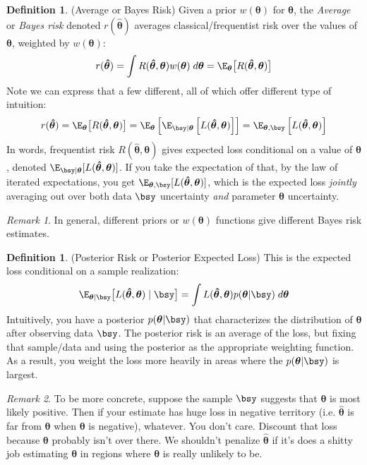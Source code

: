 \documentclass[12pt]{article}
\theoremstyle{plain}
\theoremstyle{definition}
\newtheorem{defn}[thm]{Definition}
\theoremstyle{remark}
\newtheorem*{rmk}{Remark}
\newcommand{\bstheta}{\boldsymbol{\theta}}
\newcommand{\bshattheta}{\boldsymbol{\hat{\theta}}}
\begin{document}
\begin{defn}(Average or Bayes Risk)
\label{defn:bayesrisk}
Given a prior $w(\bstheta)$ for $\bstheta$, the \emph{Average} or
\emph{Bayes risk} denoted $r(\bshattheta)$ averages
classical/frequentist risk over the values of $\bstheta$, weighted by
$w(\bstheta)$:
\begin{align*}
  r(\bshattheta)
  = \int R(\bshattheta,\bstheta) w(\bstheta) \; d\bstheta
  = \E_{\bstheta}\big[ R(\bshattheta,\bstheta)\big]
\end{align*}
Note we can express that a few different, all of which offer different
type of intuition:
\begin{align*}
  r(\bshattheta)
  = \E_{\bstheta}\big[ R(\bshattheta,\bstheta)\big]
  = \E_{\bstheta}\left[
      \E_{\bsy|\bstheta}\left[
      L(\bshattheta,\bstheta)
      \right]
    \right]
  = \E_{\bstheta,\bsy}\left[ L(\bshattheta,\bstheta) \right]
\end{align*}
In words, frequentist risk $R(\bshattheta,\bstheta)$ gives expected loss
conditional on a value of $\bstheta$, denoted
$\E_{\bsy|\bstheta}[L(\bshattheta,\bstheta)]$. If you take the
expectation of that, by the law of iterated expectations, you get
$\E_{\bstheta,\bsy}[L(\bshattheta,\bstheta)]$, which is the expected
loss \emph{jointly} averaging out over both data $\bsy$
uncertainty \emph{and} parameter $\bstheta$ uncertainty.
\end{defn}
\begin{rmk}
In general, different priors or $w(\bstheta)$ functions give
different Bayes risk estimates.
\end{rmk}
\clearpage

\begin{defn}{(Posterior Risk or Posterior Expected Loss)}
This is the expected loss conditional on a sample realization:
\begin{align*}
  \E_{\bstheta|\bsy}\big[
    L(\bshattheta,\bstheta)\;|\;\bsy
  \big]
  =
  \int L(\bshattheta,\bstheta)
  p(\bstheta|\bsy) \; d\bstheta
\end{align*}
Intuitively, you have a posterior
$p(\bstheta|\bsy)$ that characterizes the
distribution of $\bstheta$ after observing data $\bsy$. The
posterior risk is an average of the loss, but fixing that sample/data
and using the posterior as the appropriate weighting function. As a
result, you weight the loss more heavily in areas where the
$p(\bstheta|\bsy)$ is largest.
\end{defn}

\begin{rmk}
To be more concrete, suppose the sample $\bsy$ suggests that
$\bstheta$ is most likely positive.
Then if your estimate has huge loss in negative territory (i.e.
$\bshattheta$ is far from $\bstheta$ when $\bstheta$ is negative),
whatever. You don't care. Discount that loss because $\bstheta$ probably
isn't over there. We shouldn't penalize $\bshattheta$ if it's does a
shitty job estimating $\bstheta$ in regions where $\bstheta$ is really
unlikely to be.
\end{rmk}
\end{document}
